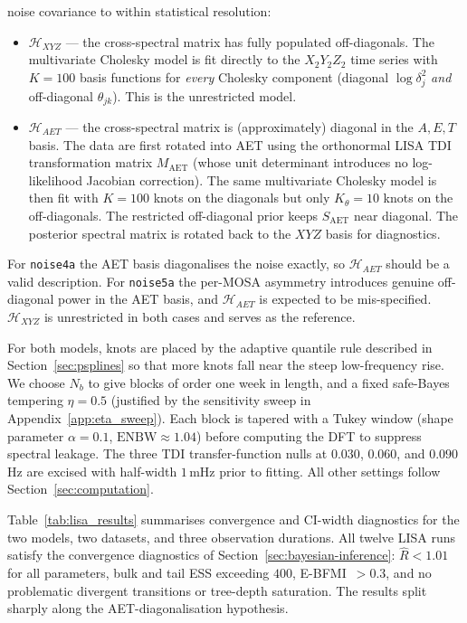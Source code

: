 \documentclass[%
	reprint,
	nofootinbib,
	amsmath,
	amssymb,
	aps,
]{revtex4-2}
\begin{document}
	noise covariance to within statistical resolution:
	\begin{itemize}
		\item $\mathcal{H}_{XYZ}$ --- the cross-spectral matrix has
		fully populated off-diagonals. The multivariate Cholesky
		model is fit directly to the $X_{2}Y_{2}Z_{2}$ time series
		with $K=100$ basis functions for \emph{every} Cholesky
		component (diagonal $\log\delta_{j}^{2}$ \emph{and}
		off-diagonal $\theta_{jk}$). This is the unrestricted model.
		\item $\mathcal{H}_{AET}$ --- the cross-spectral matrix is
		(approximately) diagonal in the $A,E,T$ basis. The data are
		first rotated into AET using the orthonormal LISA TDI
		transformation matrix $M_{\mathrm{AET}}$ (whose unit
		determinant introduces no log-likelihood Jacobian
		correction). The same multivariate Cholesky model is then
		fit with $K=100$ knots on the diagonals but only
		$K_{\theta}=10$ knots on the off-diagonals. The restricted
		off-diagonal prior keeps $S_{\mathrm{AET}}$ near diagonal.
		The posterior spectral matrix is rotated back to the $XYZ$
		basis for diagnostics.
	\end{itemize}
	For \texttt{noise4a} the AET basis diagonalises the noise
	exactly, so $\mathcal{H}_{AET}$ should be a valid description.
	For \texttt{noise5a} the per-MOSA asymmetry introduces genuine
	off-diagonal power in the AET basis, and $\mathcal{H}_{AET}$
	is expected to be mis-specified. $\mathcal{H}_{XYZ}$ is
	unrestricted in both cases and serves as the reference.

	For both models, knots are placed by the adaptive quantile rule
	described in Section~\ref{sec:psplines} so that more knots fall near
	the steep low-frequency rise. We choose $N_{b}$ to give blocks of
	order one week in length, and a fixed safe-Bayes tempering
	$\eta=0.5$ (justified by the sensitivity sweep in
	Appendix~\ref{app:eta_sweep}). Each block is tapered with a Tukey window
	(shape parameter $\alpha=0.1$, $\mathrm{ENBW}\approx1.04$) before
	computing the DFT to suppress spectral leakage. The three TDI
	transfer-function nulls at $0.030$, $0.060$, and $0.090$\,Hz are
	excised with half-width $1$\,mHz prior to fitting. All other settings
	follow Section~\ref{sec:computation}.

	Table~\ref{tab:lisa_results} summarises convergence and CI-width
	diagnostics for the two models, two datasets, and three observation
	durations. All twelve LISA runs satisfy the convergence diagnostics of
	Section~\ref{sec:bayesian-inference}: $\hat R<1.01$ for all parameters,
	bulk and tail ESS exceeding $400$, E-BFMI~$>0.3$, and no problematic
	divergent transitions or tree-depth saturation. The results split sharply along the
	AET-diagonalisation hypothesis.
\end{document}
